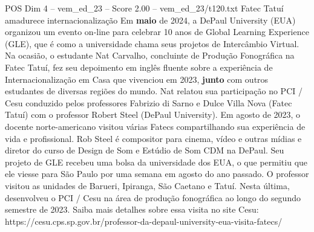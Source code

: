 \begin{textsample}{POS Dim 4 – vem\_ed\_23 – Score 2.00 – vem\_ed\_23/t120.txt}  \label{ex:f4_pos_093}
Fatec Tatuí amadurece internacionalização Em \textbf{maio} de 2024, a DePaul University (EUA) organizou um evento on-line para celebrar 10 anos de Global Learning Experience (GLE), que é como a universidade chama seus projetos de Intercâmbio Virtual.
Na ocasião, o estudante Nat Carvalho, concluinte de Produção Fonográfica na Fatec Tatuí, fez seu depoimento em inglês fluente sobre a experiência de Internacionalização em Casa que vivenciou em 2023, \textbf{junto} com outros estudantes de diversas regiões do mundo.
Nat relatou sua participação no PCI / Cesu conduzido pelos professores Fabrizio di Sarno e Dulce Villa Nova (Fatec Tatuí) com o professor Robert Steel (DePaul University).
Em agosto de 2023, o docente norte-americano visitou várias Fatecs compartilhando sua experiência de vida e profissional.
Rob Steel é compositor para cinema, vídeo e outras mídias e diretor do curso de Design de Som e Estúdio de Som CDM na DePaul.
Seu projeto de GLE recebeu uma bolsa da universidade dos EUA, o que permitiu que ele viesse para São Paulo por uma semana em agosto do ano passado.
O professor visitou as unidades de Barueri, Ipiranga, São Caetano e Tatuí.
Nesta última, desenvolveu o PCI / Cesu na área de produção fonográfica ao longo do segundo semestre de 2023.
Saiba mais detalhes sobre essa visita no site Cesu: https://cesu.cps.sp.gov.br/professor-da-depaul-university-eua-visita-fatecs/

\end{textsample}
